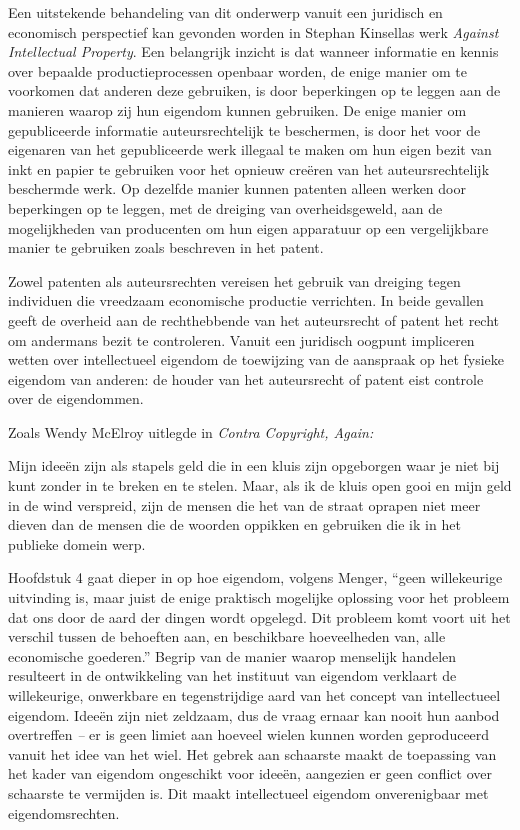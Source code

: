 Een uitstekende behandeling van dit onderwerp vanuit een juridisch en economisch perspectief kan gevonden worden in Stephan Kinsella\textquotesingle s werk \emph{Against Intellectual Property}. \autocite{85} Een belangrijk inzicht is dat wanneer informatie en kennis over bepaalde productieprocessen openbaar worden, de enige manier om te voorkomen dat anderen deze gebruiken, is door beperkingen op te leggen aan de manieren waarop zij hun eigendom kunnen gebruiken. De enige manier om gepubliceerde informatie auteursrechtelijk te beschermen, is door het voor de eigenaren van het gepubliceerde werk illegaal te maken om hun eigen bezit van inkt en papier te gebruiken voor het opnieuw creëren van het auteursrechtelijk beschermde werk. Op dezelfde manier kunnen patenten alleen werken door beperkingen op te leggen, met de dreiging van overheidsgeweld, aan de mogelijkheden van producenten om hun eigen apparatuur op een vergelijkbare manier te gebruiken zoals beschreven in het patent.

Zowel patenten als auteursrechten vereisen het gebruik van dreiging tegen individuen die vreedzaam economische productie verrichten. In beide gevallen geeft de overheid aan de rechthebbende van het auteursrecht of patent het recht om andermans bezit te controleren. Vanuit een juridisch oogpunt impliceren wetten over intellectueel eigendom de toewijzing van de aanspraak op het fysieke eigendom van anderen: de houder van het auteursrecht of patent eist controle over de eigendommen.

Zoals Wendy McElroy uitlegde in \emph{Contra Copyright, Again:}

\begin{blockquotebox}
    Mijn ideeën zijn als stapels geld die in een kluis zijn opgeborgen waar je niet bij kunt zonder in te breken en te stelen. Maar, als ik de kluis open gooi en mijn geld in de wind verspreid, zijn de mensen die het van de straat oprapen niet meer dieven dan de mensen die de woorden oppikken en gebruiken die ik in het publieke domein werp.\footnotemark
\end{blockquotebox}
\autocite{86}

Hoofdstuk 4 gaat dieper in op hoe eigendom, volgens Menger, ``geen willekeurige uitvinding is, maar juist de enige praktisch mogelijke oplossing voor het probleem dat ons door de aard der dingen wordt opgelegd. Dit probleem komt voort uit het verschil tussen de behoeften aan, en beschikbare hoeveelheden van, alle economische goederen.'' \autocite{87} Begrip van de manier waarop menselijk handelen resulteert in de ontwikkeling van het instituut van eigendom verklaart de willekeurige, onwerkbare en tegenstrijdige aard van het concept van intellectueel eigendom. Ideeën zijn niet zeldzaam, dus de vraag ernaar kan nooit hun aanbod overtreffen \emph{--} er is geen limiet aan hoeveel wielen kunnen worden geproduceerd vanuit het idee van het wiel. Het gebrek aan schaarste maakt de toepassing van het kader van eigendom ongeschikt voor ideeën, aangezien er geen conflict over schaarste te vermijden is. Dit maakt intellectueel eigendom onverenigbaar met eigendomsrechten.

